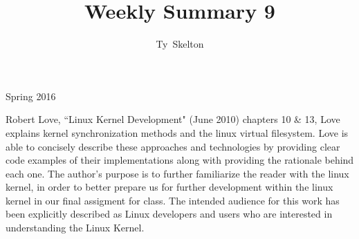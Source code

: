 \documentclass[10pt,draftclsnofoot,onecolumn]{IEEEtran}
\begin{document}
\singlespacing
\title{Weekly Summary 9}

\author{Ty~Skelton}

{Spring 2016}

\maketitle
\IEEEpeerreviewmaketitle

Robert Love, ``Linux Kernel Development" (June 2010) chapters 10 \& 13, Love explains kernel synchronization methods and the linux virtual filesystem.
Love is able to concisely describe these approaches and technologies by providing clear code examples of their implementations along with providing the rationale behind each one.
The author's purpose is to further familiarize the reader with the linux kernel, in order to better prepare us for further development within the linux kernel in our final assigment for class.
The intended audience for this work has been explicitly described as Linux developers and users who are interested in understanding the Linux Kernel.
\end{document}
